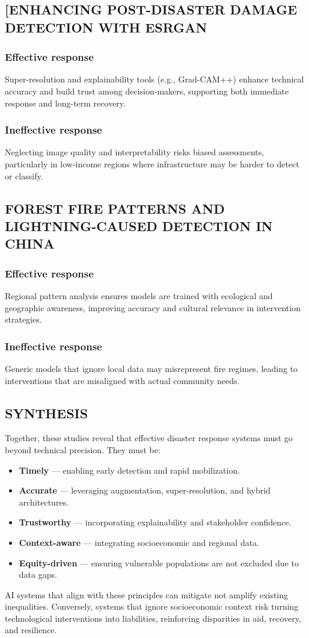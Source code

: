 \documentclass[conference,a4paper]{IEEEtran}
\begin{document}
\subsection{[ENHANCING POST-DISASTER DAMAGE DETECTION WITH ESRGAN}
\subsubsection{Effective response}
Super-resolution and explainability tools (e.g., Grad-CAM++) enhance technical accuracy and build trust among decision-makers, supporting both immediate response and long-term recovery.
\subsubsection{Ineffective response}
Neglecting image quality and interpretability risks biased assessments, particularly in low-income regions where infrastructure may be harder to detect or classify.
\subsection{FOREST FIRE PATTERNS AND LIGHTNING-CAUSED DETECTION IN CHINA}
\subsubsection{Effective response}
Regional pattern analysis ensures models are trained with ecological and geographic awareness, improving accuracy and cultural relevance in intervention strategies.
\subsubsection{Ineffective response}
Generic models that ignore local data may misrepresent fire regimes, leading to interventions that are misaligned with actual community needs.
\subsection{SYNTHESIS}
Together, these studies reveal that effective disaster response systems must go beyond technical precision. They must be:
\begin{itemize}
    \item \textbf{Timely} — enabling early detection and rapid mobilization.
    \item \textbf{Accurate} — leveraging augmentation, super-resolution, and hybrid architectures.
    \item \textbf{Trustworthy} — incorporating explainability and stakeholder confidence.
    \item \textbf{Context-aware} — integrating socioeconomic and regional data.
    \item \textbf{Equity-driven} — ensuring vulnerable populations are not excluded due to data gaps.
\end{itemize}
AI systems that align with these principles can mitigate not amplify existing inequalities. Conversely, systems that ignore socioeconomic context risk turning technological interventions into liabilities, reinforcing disparities in aid, recovery, and resilience.
\end{document}
